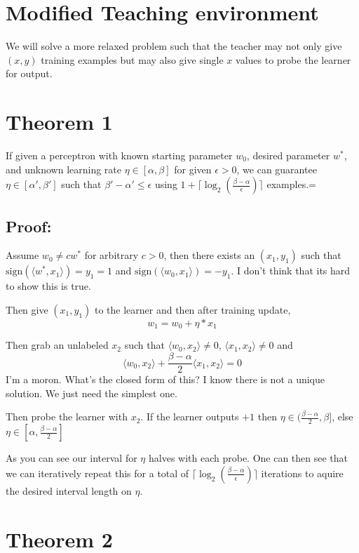 \documentclass{article}
\begin{document}
\section*{Modified Teaching environment}
We will solve a more relaxed problem such that the teacher may not only give $(x,y)$ training examples but may also give single $x$ values to probe the learner for output. 

\section*{Theorem 1}
If given a perceptron with known starting parameter $w_0$, desired parameter $w^*$, and unknown learning rate $\eta \in [\alpha , \beta]$ for given $\epsilon > 0$, we can guarantee $\eta \in [\alpha', \beta']$ such that $\beta' - \alpha' \leq \epsilon$ using $1 + \lceil \log_2(\frac{\beta - \alpha}{\epsilon})\rceil$ examples.=

\subsection*{Proof:}
Assume $w_0 \neq cw^*$ for arbitrary $c > 0$, then there exists an $(x_1, y_1)$ such that $\text{sign}(\langle w^*,x_1 \rangle) = y_1 = 1$ and $\text{sign}(\langle w_0,x_1 \rangle) = -y_1$.
\color{red}
I don't think that its hard to show this is true.
\color{black}

Then give $(x_1, y_1)$ to the learner and then after training update,
$$
w_1 = w_0 + \eta* x_1
$$

Then grab an unlabeled $x_2$ such that
$\langle w_0,x_2 \rangle \neq 0$, $\langle x_1, x_2 \rangle \neq 0$
and 
$$
\langle w_0,x_2 \rangle + \frac{\beta - \alpha}{2} \langle x_1, x_2 \rangle = 0
$$
\color{red}
I'm a moron. What's the closed form of this? I know there is not a unique solution. We just need the simplest one.
\color{black}

Then probe the learner with $x_2$. If the learner outputs $+1$ then
$\eta \in (\frac{\beta - \alpha}{2} , \beta]$, else 
$\eta \in [\alpha,\frac{\beta - \alpha}{2}]$

As you can see our interval for $\eta$ halves with each probe. One can then see that we can iteratively repeat this for a total of $ \lceil \log_2(\frac{\beta - \alpha}{\epsilon})\rceil$ iterations to aquire the desired interval length on $\eta$.


\section*{Theorem 2}
\color{red}
\end{document}
